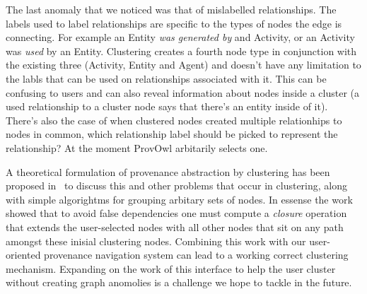 The last anomaly that we noticed was that of mislabelled relationships. The labels used to label relationships are specific to the types of nodes the edge is connecting. For example an Entity \textit{was generated by} and Activity, or an Activity was \textit{used} by an Entity. Clustering creates a fourth node type in conjunction with the existing three (Activity, Entity and Agent) and doesn't have any limitation to the labls that can be used on relationships associated with it. This can be confusing to users and can also reveal information about nodes inside a cluster (a used relationship to a cluster node says that there's an entity inside of it). There's also the case of when clustered nodes created multiple relationhips to nodes in common, which relationship label should be picked to represent the relationship? At the moment ProvOwl arbitarily selects one. 

A theoretical formulation of provenance abstraction by clustering has been proposed in~\cite{Missier2014} to discuss this and other problems that occur in clustering, along with simple algorightms for grouping arbitary sets of nodes. In essense the work showed that to avoid false dependencies one must compute a \textit{closure} operation that extends the user-selected nodes with all other nodes that sit on any path amongst these inisial clustering nodes. Combining this work with our user-oriented provenance navigation system can lead to a working correct clustering mechanism. Expanding on the work of this interface to help the user cluster without creating graph anomolies is a challenge we hope to tackle in the future.
